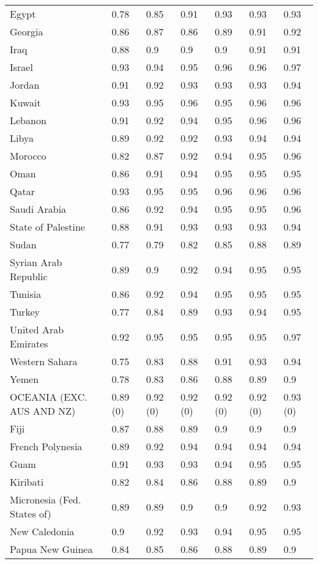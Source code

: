 \begin{longtable}[t]{lllllll}
Egypt & 0.78 & 0.85 & 0.91 & 0.93 & 0.93 & 0.93\\
Georgia & 0.86 & 0.87 & 0.86 & 0.89 & 0.91 & 0.92\\
Iraq & 0.88 & 0.9 & 0.9 & 0.9 & 0.91 & 0.91\\
Israel & 0.93 & 0.94 & 0.95 & 0.96 & 0.96 & 0.97\\
Jordan & 0.91 & 0.92 & 0.93 & 0.93 & 0.93 & 0.94\\
Kuwait & 0.93 & 0.95 & 0.96 & 0.95 & 0.96 & 0.96\\
Lebanon & 0.91 & 0.92 & 0.94 & 0.95 & 0.96 & 0.96\\
Libya & 0.89 & 0.92 & 0.92 & 0.93 & 0.94 & 0.94\\
Morocco & 0.82 & 0.87 & 0.92 & 0.94 & 0.95 & 0.96\\
Oman & 0.86 & 0.91 & 0.94 & 0.95 & 0.95 & 0.95\\
Qatar & 0.93 & 0.95 & 0.95 & 0.96 & 0.96 & 0.96\\
Saudi Arabia & 0.86 & 0.92 & 0.94 & 0.95 & 0.95 & 0.96\\
State of Palestine & 0.88 & 0.91 & 0.93 & 0.93 & 0.93 & 0.94\\
Sudan & 0.77 & 0.79 & 0.82 & 0.85 & 0.88 & 0.89\\
Syrian Arab Republic & 0.89 & 0.9 & 0.92 & 0.94 & 0.95 & 0.95\\
Tunisia & 0.86 & 0.92 & 0.94 & 0.95 & 0.95 & 0.95\\
Turkey & 0.77 & 0.84 & 0.89 & 0.93 & 0.94 & 0.95\\
United Arab Emirates & 0.92 & 0.95 & 0.95 & 0.95 & 0.95 & 0.97\\
Western Sahara & 0.75 & 0.83 & 0.88 & 0.91 & 0.93 & 0.94\\
Yemen & 0.78 & 0.83 & 0.86 & 0.88 & 0.89 & 0.9\\
OCEANIA (EXC. AUS AND NZ) & 0.89 (0) & 0.92 (0) & 0.92 (0) & 0.92 (0) & 0.92 (0) & 0.93 (0)\\
Fiji & 0.87 & 0.88 & 0.89 & 0.9 & 0.9 & 0.9\\
French Polynesia & 0.89 & 0.92 & 0.94 & 0.94 & 0.94 & 0.94\\
Guam & 0.91 & 0.93 & 0.93 & 0.94 & 0.95 & 0.95\\
Kiribati & 0.82 & 0.84 & 0.86 & 0.88 & 0.89 & 0.9\\
Micronesia (Fed. States of) & 0.89 & 0.89 & 0.9 & 0.9 & 0.92 & 0.93\\
New Caledonia & 0.9 & 0.92 & 0.93 & 0.94 & 0.95 & 0.95\\
Papua New Guinea & 0.84 & 0.85 & 0.86 & 0.88 & 0.89 & 0.9\\

\end{longtable}
